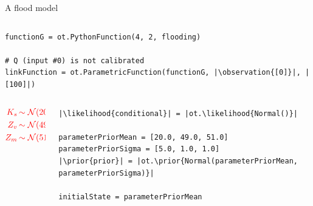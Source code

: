 \documentclass{beamer}
\newcommand{\prior}[1]{\textcolor{red}{#1}}
\newcommand{\likelihood}[1]{\textcolor{green}{#1}}
\newcommand{\observation}[1]{\textcolor{orange}{#1}}
\begin{document}
\begin{frame}[containsverbatim]{A flood model}
\begin{columns}
\begin{column}{0.65\textwidth}
\begin{lstlisting}
functionG = ot.PythonFunction(4, 2, flooding)

# Q (input #0) is not calibrated
linkFunction = ot.ParametricFunction(functionG, |\observation{[0]}|, |[100]|)
                \end{lstlisting}
            \end{column}
        \end{columns}



    \begin{columns}
        \begin{column}{0.36\textwidth}
            \begin{align*}
                \prior{K_s} \, &\prior{\sim \mathcal{N}(20, 5)} \\
                \prior{Z_v} \, &\prior{\sim \mathcal{N}(49, 1)} \\
                \prior{Z_m} \, &\prior{\sim \mathcal{N}(51, 1)}
            \end{align*}
        \end{column}
        \begin{column}{0.64\textwidth}
            \begin{lstlisting}
|\likelihood{conditional}| = |ot.\likelihood{Normal()}|

parameterPriorMean = [20.0, 49.0, 51.0]
parameterPriorSigma = [5.0, 1.0, 1.0]
|\prior{prior}| = |ot.\prior{Normal(parameterPriorMean, parameterPriorSigma)}|

initialState = parameterPriorMean
            \end{lstlisting}
        \end{column}
    \end{columns}

\end{frame}

\end{document}
